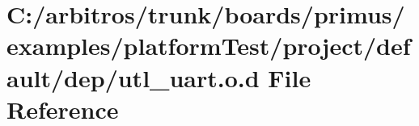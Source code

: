 \hypertarget{platform_test_2project_2default_2dep_2utl__uart_8o_8d}{\section{C\-:/arbitros/trunk/boards/primus/examples/platform\-Test/project/default/dep/utl\-\_\-uart.o.\-d File Reference}
\label{platform_test_2project_2default_2dep_2utl__uart_8o_8d}
}
